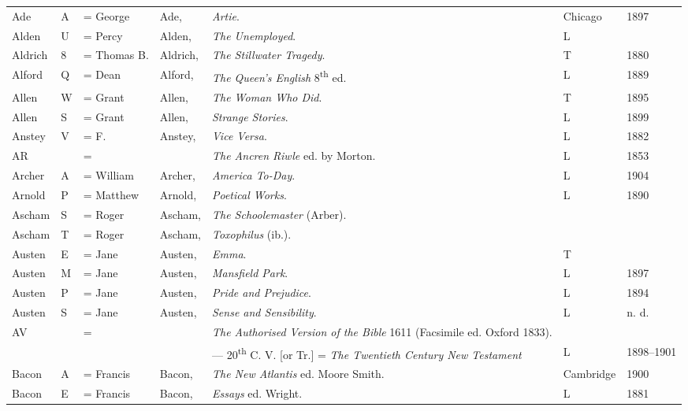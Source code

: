 \begin{sidewaystable}
\centering
\begin{tabular}{p{} p{} p{} p{} p{} p{} p{}}
Ade & A & = George & Ade, & \textit{Artie}. & Chicago & 1897 \\
Alden & U & = Percy & Alden, & \textit{The Unemployed}. & L & \\
Aldrich & 8 & = Thomas B. & Aldrich, & \textit{The Stillwater Tragedy}. & T & 1880 \\
Alford & Q & = Dean & Alford, & \textit{The Queen's English} 8\textsuperscript{th} ed. & L & 1889 \\
Allen & W & = Grant & Allen, & \textit{The Woman Who Did}. & T & 1895 \\
Allen & S & = Grant & Allen, & \textit{Strange Stories}. & L & 1899 \\
Anstey & V & = F. & Anstey, & \textit{Vice Versa}. & L & 1882 \\
AR & & = & &\textit{The Ancren Riwle} ed. by Morton. & L & 1853 \\
Archer & A & = William & Archer, & \textit{America To-Day}. & L & 1904 \\
Arnold & P & = Matthew & Arnold, & \textit{Poetical Works}. & L & 1890 \\
Ascham & S & = Roger & Ascham, & \textit{The Schoolemaster} (Arber). & & \\
Ascham & T & = Roger & Ascham, & \textit{Toxophilus} (ib.). & & \\
Austen & E & = Jane & Austen, & \textit{Emma}. & T & \\
Austen & M & = Jane & Austen, & \textit{Mansfield Park}. & L & 1897 \\
Austen & P & = Jane & Austen, & \textit{Pride and Prejudice}. & L & 1894 \\
Austen & S & = Jane & Austen, & \textit{Sense and Sensibility}. & L & n. d. \\
AV & & = && \textit{The Authorised Version of the Bible} 1611 (Facsimile ed. Oxford 1833). & & \\
& & & & — 20\textsuperscript{th} C. V. [or Tr.] = \textit{The Twentieth Century New Testament} & L & 1898--1901 \\
Bacon & A & = Francis & Bacon, & \textit{The New Atlantis} ed. Moore Smith. & Cambridge & 1900 \\
Bacon & E & = Francis & Bacon, & \textit{Essays} ed. Wright. & L & 1881 \\

\end{tabular}
\end{sidewaystable}
